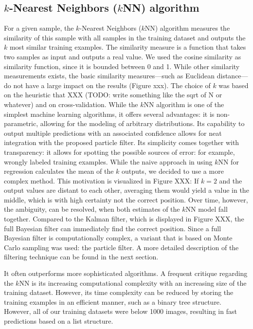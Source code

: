 \subsection{$k$-Nearest Neighbors ($k$NN) algorithm}


For a given sample, the $k$-Nearest Neighbors ($k$NN) algorithm measures the similarity of this sample with all samples in the training dataset and outputs the $k$ most similar training examples. The similarity measure is a function that takes two samples as input and outputs a real value. We used the cosine similarity as similarity function, since it is bounded between 0 and 1. While other similarity measurements exists, the basic similarity measures—such as Euclidean distance—do not have a large impact on the results (Figure xxx). The choice of $k$ was based on the heuristic that XXX (TODO: write something like the sqrt of N or whatever) and on cross-validation.  
While the $k$NN algorithm is one of the simplest machine learning algorithms, it
offers several advantages: it is non-parametric, allowing for the
modeling of arbitrary distributions. Its capability to output multiple
predictions with an associated confidence allows for neat integration
with the proposed particle filter. Its simplicity comes together with transparency: it allows for spotting the possible sources of error: for example, wrongly labeled training examples. While the naive approach in using $k$NN for regression calculates the mean of the $k$ outputs, we decided to use a more complex method. This motivation is visualized in Figure XXX: If $k=2$ and the output values are distant to each other, averaging them would yield a value in the middle, which is with high certainty not the correct position. Over time, however, the ambiguity, can be resolved, when both estimates of the $k$NN model fall together. Compared to the Kalman filter, which is displayed in Figure XXX, the full Bayesian filter can immediately find the correct position. Since a full Bayesian filter is computationally complex, a variant that is based on Monte Carlo sampling was used: the particle filter. A more detailed description of the filtering technique can be found in the next section.  


It often outperforms more sophisticated algorithms. A frequent critique regarding the $k$NN is its increasing computational complexity with an increasing size of the training dataset. However, its time complexity can be reduced by storing the training examples in an efficient manner, such as a binary tree structure. However, all of our training datasets were below 1000 images, resulting in fast predictions based on a list structure. 


